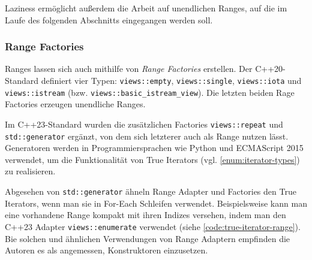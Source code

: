 \documentclass[runningheads]{llncs}
\begin{document}
\begin{figure}
\end{figure}

\noindent Laziness ermöglicht außerdem die Arbeit auf unendlichen Ranges, auf die im Laufe des folgenden Abschnitts eingegangen werden soll.

\subsubsection{Range Factories}

Ranges lassen sich auch mithilfe von \textit{Range Factories} erstellen.
Der C++20-Standard definiert vier Typen: \texttt{views::empty}, \texttt{views::single}, \texttt{views::iota} und \texttt{views::istream} (bzw. \texttt{views::basic\_istream\_view}).
Die letzten beiden Rage Factories erzeugen unendliche Ranges.

Im C++23-Standard wurden die zusätzlichen Factories \texttt{views::repeat} und \texttt{std::generator} ergänzt, von dem sich letzterer auch als Range nutzen lässt.
Generatoren werden in Programmiersprachen wie Python und ECMAScript 2015 verwendet, um die Funktionalität von True Iterators (vgl. \ref{enum:iterator-types}) zu realisieren.

Abgesehen von \texttt{std::generator} ähneln Range Adapter und Factories den True Iterators, wenn man sie in For-Each Schleifen verwendet.
Beispielsweise kann man eine vorhandene Range kompakt mit ihren Indizes versehen, indem man den C++23 Adapter \texttt{views::enumerate} verwendet (siehe \autoref{code:true-iterator-range}).
Bie solchen und ähnlichen Verwendungen von Range Adaptern empfinden die Autoren es als angemessen, Konstruktoren einzusetzen.
\end{document}

